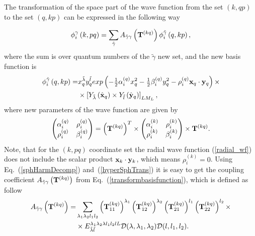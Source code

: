 \documentclass[12pt,a4paper,twoside]{article}
\begin{document}
The transformation of the space part of the wave function from the set $ \left(k, qp \right) $ to the set $ \left(q, kp \right) $ can be expressed in the following way

  \begin{equation}
 \label{transformbasisfunction}
 \phi_{i}^{\gamma}\left(k, pq \right) = \sum_{\tilde{\gamma}} A_{\tilde{\gamma}\gamma}\left( {\bf T}^{(kq)} \right)
  \phi_{i}^{\tilde{\gamma} } \left(q, kp \right) ,
 \end{equation}
where the sum is over quantum numbers of the $ \tilde {\gamma} $ new set, and the new basis function is
\begin{align}
\phi_{i}^{\tilde{\gamma} } \left(q, kp \right)  =  &
 x_{q}^{\tilde{\lambda}} y_{q}^{\tilde{l}} exp\left(- \tfrac{1}{2} \alpha^{(q)}_{i} x_{q}^{2} - \tfrac{1}{2} \beta^{(q)}_{i}  y_{q}^{2} - \rho^{(q)}_i {\bf x}_{q} \cdot {\bf y}_{q}  \right) 
\times  \nonumber \\ 
&\times  \left[ Y_{\tilde{\lambda}} \left(  \hat{ \bf x}_q \right) \times Y_{\tilde{l}} \left( \hat{\bf y}_q \right) \right]_{LM_L},
\label{newBasis}
\end{align}
where new parameters of the wave function are given by
\begin{align}
\begin{pmatrix}
\alpha_i^{(q)} & \rho_i^{(q)} \\ 
\rho_i^{(q)} & \beta_i^{(q)}
\end{pmatrix}  = \left( {\bf T}^{(kq)} \right)^{T} \times 
\begin{pmatrix}
\alpha_i^{(k)} & \rho_i^{(k)} \\ 
\rho_i^{(k)} & \beta_i^{(k)}
\end{pmatrix} \times  {\bf T}^{(kq)}.
\end{align}
Note, that for the $(k,pq)$ coordinate set the radial wave function (\ref{radial_wf}) does not include the scalar product ${\bf x}_k \cdot {\bf y}_k$, which means $\rho_i^{(k)}=0$.  
 Using Eq.~(\ref{sphHarmDecomp}) and~(\ref{hyperSphTrans}) it is easy to get the coupling coefficient $ A_{\tilde{\gamma} \gamma} \left( {\bf T}^{(kq)} \right) $ from Eq.~(\ref{transformbasisfunction}), which is defined as follow 
 \begin{align}
A_{\tilde{\gamma}\gamma}\left( {\bf T}^{(kq)} \right) = & \sum_{\lambda_1 \lambda_2 l_1 l_2} 
\left({\bf T}_{11}^{(kq)} \right)^{\lambda_1} 
\left({\bf T}_{12}^{(kq)} \right)^{\lambda_2} 
\left({\bf T}_{21}^{(kq)} \right)^{l_1} 
\left({\bf T}_{22}^{(kq)} \right)^{l_2} 
\times 
\\
& \times {E}^{\lambda_1 \lambda_2 \lambda l_1 l_2 l L}_{\tilde{\lambda} \tilde{l} } \mathcal{D}(\lambda,\lambda_1,\lambda_2) \mathcal{D}(l,l_1,l_2).   \nonumber 
\end{align}
\end{document}
